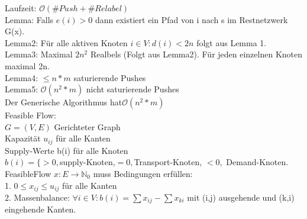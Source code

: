 \documentclass[a4paper]{article}
\newcommand{\oh}[1]{$\mathcal{O}(#1)$}
\begin{document}
Laufzeit: \oh{\#Push+\#Relabel}\\
Lemma: Falls $e(i)>0$ dann existiert ein Pfad von i nach s im Restnetzwerk G(x).\\
Lemma2: Für alle aktiven Knoten $i\in V: d(i)<2n$ folgt aus Lemma 1.\\
Lemma3: Maximal $2n^2$ Realbels (Folgt aus Lemma2). Für jeden einzelnen Knoten maximal 2n.\\
Lemma4: $\leq n*m$ saturierende Pushes\\
Lemma5: \oh{n^2*m} nicht saturierende Pushes\\
Der Generische Algorithmus hat\oh{n^2*m}\\

Feasible Flow:\\
$G=(V,E)$ Gerichteter Graph\\
Kapazität $u_{ij}$ für alle Kanten\\
Supply-Werte b(i) für alle Knoten\\
$b(i)=\lbrace >0, $supply-Knoten,$=0, $Transport-Knoten, $<0,$ Demand-Knoten.\\
FeasibleFlow $x:E\rightarrow\mathbb{N}_0$ muss Bedingungen erfüllen:\\
1. $0\leq x_{ij} \leq u_{ij}$ für alle Kanten\\
2. Massenbalance: $\forall i\in V: b(i)=\sum x_{ij} - \sum x_{ki}$ mit (i,j) ausgehende und (k,i) eingehende Kanten.\\
\end{document}
